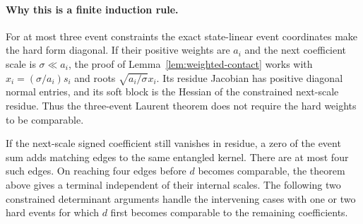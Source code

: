 \paragraph{Why this is a finite induction rule.}
For at most three event constraints the exact state-linear event coordinates make the hard form diagonal. If their positive weights are $a_i$ and the next coefficient scale is $\sigma\ll a_i$, the proof of Lemma~\ref{lem:weighted-contact} works with
$x_i=(\sigma/a_i)s_i$ and roots $\sqrt{a_i/\sigma}x_i$.
Its residue Jacobian has positive diagonal normal entries, and its soft block is the Hessian of the constrained next-scale residue. Thus the three-event Laurent theorem does not require the hard weights to be comparable.

If the next-scale signed coefficient still vanishes in residue, a zero of the event sum adds matching edges to the same entangled kernel. There are at most four such edges. On reaching four edges before $d$ becomes comparable, the theorem above gives a terminal independent of their internal scales. The following two constrained determinant arguments handle the intervening cases with one or two hard events for which $d$ first becomes comparable to the remaining coefficients.
